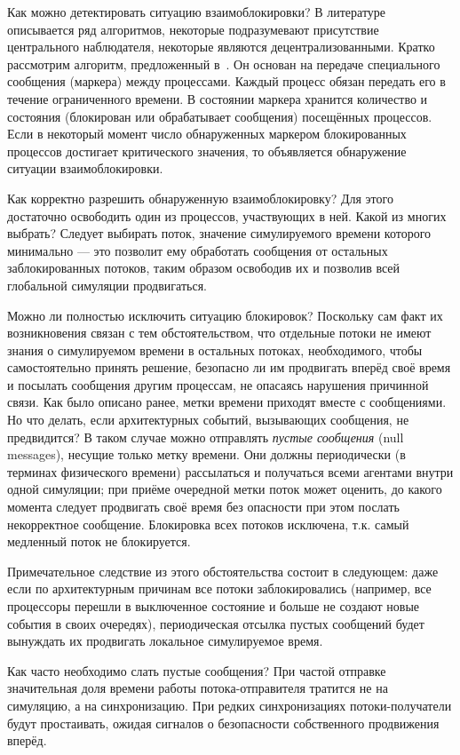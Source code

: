 Как можно детектировать ситуацию взаимоблокировки? В литературе описывается ряд алгоритмов, некоторые подразумевают присутствие центрального наблюдателя, некоторые являются децентрализованными. Кратко рассмотрим алгоритм, предложенный в~\cite{Misra86distributeddiscrete-event}. Он основан на  передаче специального сообщения (маркера) между процессами. Каждый процесс обязан передать его в течение ограниченного времени. В состоянии маркера хранится количество и состояния (блокирован или обрабатывает сообщения) посещённых процессов. Если в некоторый момент число обнаруженных маркером блокированных процессов достигает критического значения, то объявляется обнаружение ситуации взаимоблокировки.

Как корректно разрешить обнаруженную взаимоблокировку? Для этого достаточно освободить один из процессов, участвующих в ней. Какой из многих выбрать? Следует выбирать поток, значение симулируемого времени которого минимально — это позволит ему обработать сообщения от остальных заблокированных потоков, таким образом освободив их и позволив всей глобальной симуляции продвигаться. 

Можно ли полностью исключить ситуацию блокировок? Поскольку сам факт их возникновения связан с тем обстоятельством, что отдельные потоки не имеют знания о симулируемом времени в остальных потоках, необходимого, чтобы самостоятельно принять решение, безопасно ли им продвигать вперёд своё время и посылать сообщения другим процессам, не опасаясь нарушения причинной связи. Как было описано ранее, метки времени приходят вместе с сообщениями. Но что делать, если архитектурных событий, вызывающих сообщения, не предвидится? В таком случае можно отправлять \textit{пустые сообщения} (\abbr null messages), несущие только метку времени. Они должны периодически (в терминах физического времени) рассылаться и получаться всеми агентами внутри одной симуляции; при приёме очередной метки поток может оценить, до какого момента следует продвигать своё время без опасности при этом послать некорректное сообщение. Блокировка всех потоков исключена, т.к. самый медленный поток не блокируется.

Примечательное следствие из этого обстоятельства состоит в следующем: даже если по архитектурным причинам все потоки заблокировались (например, все процессоры перешли в выключенное состояние и больше не создают новые события в своих очередях), периодическая отсылка пустых сообщений будет вынуждать их продвигать локальное симулируемое время.

Как часто необходимо слать пустые сообщения? При частой отправке значительная доля времени работы потока-отправителя тратится не на симуляцию, а на синхронизацию. При редких синхронизациях потоки-получатели будут простаивать, ожидая сигналов о безопасности собственного продвижения вперёд.


